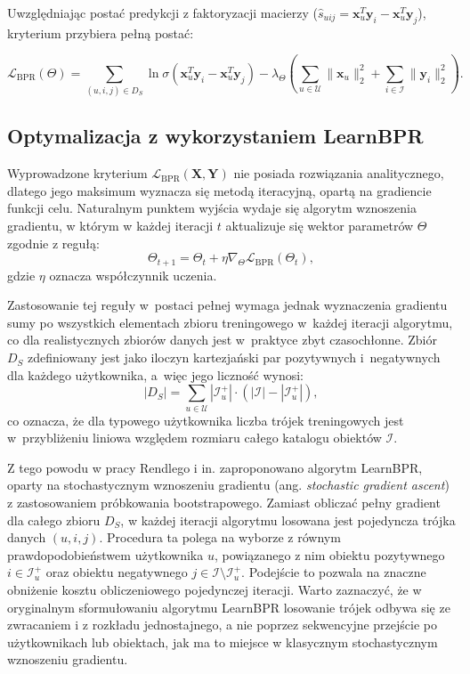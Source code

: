 Uwzględniając postać predykcji z faktoryzacji macierzy ($\hat{s}_{uij} = \mathbf{x}_u^T \mathbf{y}_i - \mathbf{x}_u^T \mathbf{y}_j$), kryterium przybiera pełną postać:

\begin{equation}
    \mathcal{L}_{\text{BPR}}(\Theta) = \sum_{(u, i, j) \in D_S} \ln \sigma\left( \mathbf{x}_u^T \mathbf{y}_i - \mathbf{x}_u^T \mathbf{y}_j \right) - \lambda_\Theta \left( \sum_{u \in \mathcal{U}} \|\mathbf{x}_u\|_2^2 + \sum_{i \in \mathcal{I}} \|\mathbf{y}_i\|_2^2 \right).
\end{equation}

\subsection{Optymalizacja z wykorzystaniem LearnBPR}

Wyprowadzone kryterium $\mathcal{L}_{\text{BPR}}(\mathbf{X}, \mathbf{Y})$ nie posiada rozwiązania analitycznego, dlatego jego maksimum wyznacza się metodą iteracyjną, opartą na gradiencie funkcji celu. Naturalnym punktem wyjścia wydaje się algorytm wznoszenia gradientu, w którym w każdej iteracji $t$ aktualizuje się wektor parametrów $\Theta$ zgodnie z regułą:
\begin{equation}
    \Theta_{t+1} = \Theta_t + \eta \nabla_\Theta \mathcal{L}_{\text{BPR}}(\Theta_t),
\end{equation}
gdzie $\eta$ oznacza współczynnik uczenia.

Zastosowanie tej reguły w~postaci pełnej wymaga jednak wyznaczenia gradientu
sumy po wszystkich elementach zbioru treningowego w~każdej iteracji algorytmu,
co dla realistycznych zbiorów danych jest w~praktyce zbyt czasochłonne. Zbiór
$D_S$ zdefiniowany jest jako iloczyn kartezjański par pozytywnych i~negatywnych
dla każdego użytkownika, a~więc jego liczność wynosi:
\begin{equation}
    |D_S| = \sum_{u \in \mathcal{U}} |\mathcal{I}_u^+| \cdot
    \left( |\mathcal{I}| - |\mathcal{I}_u^+| \right),
\end{equation}
co oznacza, że dla typowego użytkownika liczba trójek treningowych jest
w~przybliżeniu liniowa względem rozmiaru całego katalogu obiektów $\mathcal{I}$.

Z tego powodu w pracy Rendlego i in. \cite{rendle2009bpr} zaproponowano algorytm LearnBPR, oparty na stochastycznym wznoszeniu gradientu (ang. \textit{stochastic gradient ascent}) z zastosowaniem próbkowania bootstrapowego. Zamiast obliczać pełny gradient dla całego zbioru $D_{S}$, w każdej iteracji algorytmu losowana jest pojedyncza trójka danych $(u,i,j)$. Procedura ta polega na wyborze z równym prawdopodobieństwem użytkownika $u$, powiązanego z nim obiektu pozytywnego $i \in \mathcal{I}_u^+$ oraz obiektu negatywnego $j \in \mathcal{I} \setminus \mathcal{I}_u^+$. Podejście to pozwala na znaczne obniżenie kosztu obliczeniowego pojedynczej iteracji. Warto zaznaczyć, że w oryginalnym sformułowaniu algorytmu LearnBPR losowanie trójek odbywa się ze zwracaniem i z rozkładu jednostajnego, a nie poprzez sekwencyjne przejście po użytkownikach lub obiektach, jak ma to miejsce w klasycznym stochastycznym wznoszeniu gradientu.


